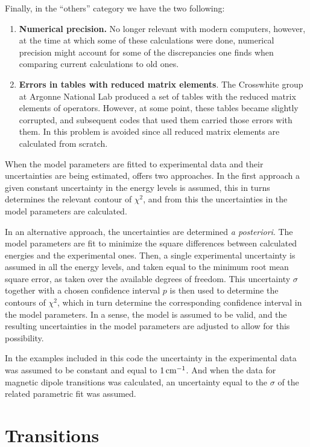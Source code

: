 \documentclass[11pt, twoside,openright]{article}
\begin{document}
Finally, in the ``others'' category we have the two following:

\begin{enumerate}
\item \textbf{Numerical precision.} No longer relevant with modern computers, however, at the time at which some of these calculations were done, numerical precision might account for some of the discrepancies one finds when comparing current calculations to old ones.
\item \textbf{Errors in tables with reduced matrix elements}. The Crosswhite group at Argonne National Lab produced a set of tables with the reduced matrix elements of operators. However, at some point, these tables became slightly corrupted, and subsequent codes that used them carried those errors with them. In \qlanth this problem is avoided since all reduced matrix elements are calculated from scratch.
\end{enumerate}

When the model parameters are fitted to experimental data and their uncertainties are being estimated, \qlanth offers two approaches. In the first approach a given constant uncertainty in the energy levels is assumed, this in turns determines the relevant contour of $\chi^2$, and from this the uncertainties in the model parameters are calculated.

In an alternative approach, the uncertainties are determined \textit{a posteriori}. The model parameters are fit to minimize the square differences between calculated energies and the experimental ones. Then, a single experimental uncertainty is assumed in all the energy levels, and taken equal to the minimum root mean  square error, as taken over the available degrees of freedom. This uncertainty $\sigma$ together with a chosen confidence interval $p$ is then used to determine the contours of $\chi^2$, which in turn determine the corresponding confidence interval in the model parameters. In a sense, the model is assumed to be valid, and the resulting uncertainties in the model parameters are adjusted to allow for this possibility.

In the examples included in this code the uncertainty in the experimental data was assumed to be constant and equal to $1 \,\text{cm}^{-1}$. And when the data for magnetic dipole transitions was calculated, an uncertainty equal to the $\sigma$ of the related parametric fit was assumed. 

\section{Transitions}\label{section:transitions}
\end{document}
